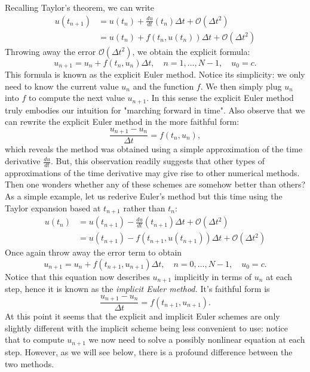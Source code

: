 Recalling Taylor's theorem, we can write 
\begin{equation*}
    \begin{aligned}
            u(t_{n+1}) & = u(t_n) + \frac{du}{dt}(t_n) \Delta t + 
    \mathcal{O}(\Delta t^2) \\
    & = u(t_n) + f(t_n, u(t_n)) \Delta t + \mathcal{O}(\Delta t^2) 
    \end{aligned}
\end{equation*}
Throwing away the error $\mathcal{O}(\Delta t^2)$, 
we obtain the explicit formula:
\begin{equation}\label{eq:explicit_euler}
    u_{n+1} = u_n + f(t_n, u_n) \Delta t, \quad n = 1, \dots, N-1, 
    \quad u_0 = c.
\end{equation}
This formula is known as the explicit Euler method. Notice its simplicity: 
we only need to know the current value $u_n$ and the function $f$. We 
then simply plug $u_n$ into $f$ to compute the next value $u_{n+1}$.
In this sense the explicit Euler method truly embodies our 
intuition for "marching forward in time". 
Also observe that we can rewrite the explicit Euler method 
in the more faithful form: 
\begin{equation*}
    \frac{u_{n+1} - u_n}{\Delta t} = f(t_n, u_n),
\end{equation*}
which reveals the method was obtained using a simple approximation of 
the time derivative $\frac{d u}{dt}$. But, this observation 
readily suggests that other types of approximations 
of the time derivative may give rise to other numerical methods. Then 
one wonders whether any of these schemes are somehow better than others? 
As a simple example, let us rederive Euler's method 
but this time using the Taylor expansion based at $t_{n+1}$ rather 
than $t_n$: 
\begin{equation*}
    \begin{aligned}
    u(t_n) & = u(t_{n+1}) - \frac{du}{dt}(t_{n+1}) \Delta t + 
    \mathcal{O}(\Delta t^2) \\
    & = u(t_{n+1}) - f(t_{n+1}, u(t_{n+1})) \Delta t + \mathcal{O}(\Delta t^2)
    \end{aligned}
\end{equation*}
Once again throw away the error term to obtain 
\begin{equation*}
    u_{n+1}  = u_{n} + f(t_{n+1}, u_{n+1}) \Delta t, \quad n = 0, \dots, N-1, 
    \quad u_0 = c.
\end{equation*}
Notice that this equation now describes $u_{n+1}$ implicitly 
in terms of $u_n$ at each step, hence it is known as the 
{\it implicit Euler method.}
It's faithful form is 
\begin{equation*}
    \frac{u_{n+1} - u_n}{\Delta t} = f(t_{n+1}, u_{n+1}). 
\end{equation*}
At this point it seems that the explicit and implicit Euler schemes are 
only slightly different with the implicit scheme being less convenient 
to use: notice that to compute $u_{n+1}$ we now need to solve a 
possibly nonlinear equation at each step. However, as we will see 
below, there is a profound difference between the two methods. 

